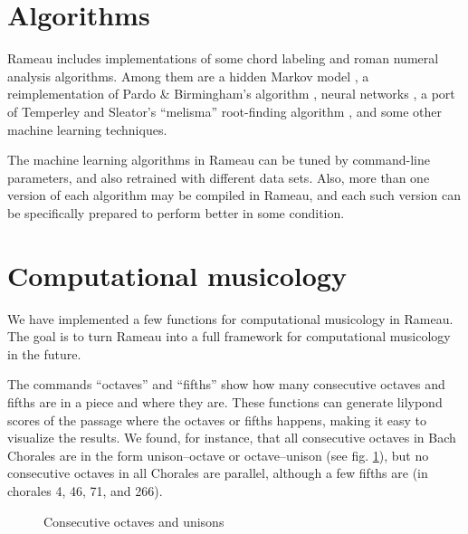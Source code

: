 \section{Algorithms}
\label{sec:algorithms}

Rameau includes implementations of some chord labeling and roman
numeral analysis algorithms. Among them are a hidden Markov model
\cite{raphael.ea03:harmonic}, a reimplementation of Pardo \&
Birmingham's algorithm \cite{pardo.ea99:automated}, neural networks
\cite{tsui02:harmonic}, a port of Temperley and Sleator's ``melisma''
root-finding algorithm \cite{temperley.ea99:modeling}, and some other
machine learning techniques.

The machine learning algorithms in Rameau can be tuned by command-line
parameters, and also retrained with different data sets. Also, more
than one version of each algorithm may be compiled in Rameau, and each
such version can be specifically prepared to perform better in some
condition.

\section{Computational musicology}
\label{sec:comp-music}


We have implemented a few functions for computational musicology in
Rameau. The goal is to turn Rameau into a full framework for
computational musicology in the future.

The commands ``octaves'' and ``fifths'' show how many consecutive
octaves and fifths are in a piece and where they are. These functions
can generate lilypond scores of the passage where the octaves or
fifths happens, making it easy to visualize the results. We found, for
instance, that all consecutive octaves in Bach Chorales are in the
form unison--octave or octave--unison (see fig.
\ref{fig:oitavas-e-unissonos}), but no consecutive octaves in all
Chorales are parallel, although a few fifths are (in chorales 4, 46,
71, and 266).

\begin{figure}[!h]
  \centering
  \qquad
  \qquad
  \caption{Consecutive octaves and unisons}
  \label{fig:oitavas-e-unissonos}
\end{figure}

